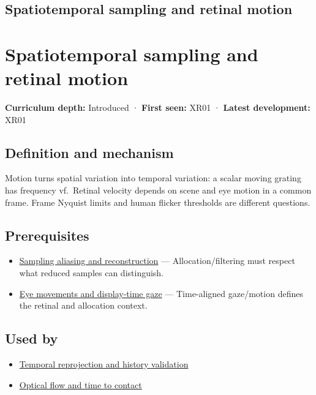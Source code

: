 \hypertarget{appendix-70895739febb}{}
\section*{Spatiotemporal sampling and retinal motion}
\chapter{Spatiotemporal sampling and retinal motion}\label{appendix-70895739febb-spatiotemporal-sampling-and-retinal-motion}

\textbf{Curriculum depth:} Introduced · \textbf{First seen:} XR01 · \textbf{Latest development:} XR01

\section{Definition and mechanism}\label{appendix-70895739febb-definition-and-mechanism}

Motion turns spatial variation into temporal variation: a scalar moving grating has frequency \textbar v\textbar f.~Retinal velocity depends on scene and eye motion in a common frame. Frame Nyquist limits and human flicker thresholds are different questions.

\section{Prerequisites}\label{appendix-70895739febb-prerequisites}

\begin{itemize}
\tightlist
\item
  \hyperref[appendix-6a7869dd79a6]{Sampling aliasing and reconstruction} --- Allocation/filtering must respect what reduced samples can distinguish.
\item
  \hyperref[appendix-a6f2c4fe1996]{Eye movements and display-time gaze} --- Time-aligned gaze/motion defines the retinal and allocation context.
\end{itemize}

\section{Used by}\label{appendix-70895739febb-used-by}

\begin{itemize}
\tightlist
\item
  \hyperref[appendix-0727340a4428]{Temporal reprojection and history validation}
\item
  \hyperref[appendix-e2e73f8cd93e]{Optical flow and time to contact}
\end{itemize}

